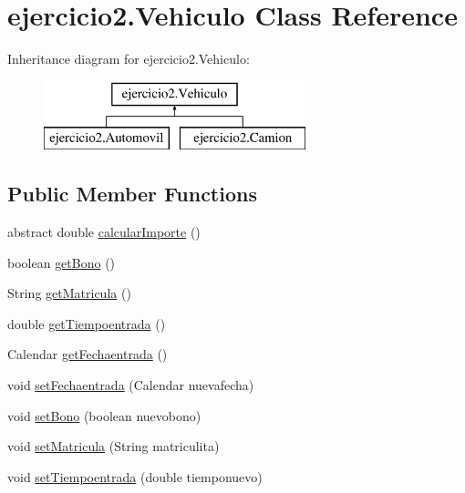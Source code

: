 \hypertarget{classejercicio2_1_1_vehiculo}{}\section{ejercicio2.\+Vehiculo Class Reference}
\label{classejercicio2_1_1_vehiculo}
Inheritance diagram for ejercicio2.\+Vehiculo\+:\begin{figure}[H]
\begin{center}
\leavevmode
\includegraphics[height=2.000000cm]{classejercicio2_1_1_vehiculo}
\end{center}
\end{figure}
\subsection*{Public Member Functions}
\begin{DoxyCompactItemize}
\item 
abstract double \mbox{\hyperlink{classejercicio2_1_1_vehiculo_ab32f1a3fc1893a90bbbaf7889274fff1}{calcular\+Importe}} ()
\item 
boolean \mbox{\hyperlink{classejercicio2_1_1_vehiculo_a2d1656bbaf85a6d0835df1fefc1b7989}{get\+Bono}} ()
\item 
String \mbox{\hyperlink{classejercicio2_1_1_vehiculo_a5dd89b85bb4c8a9da01224fea2b754f0}{get\+Matricula}} ()
\item 
double \mbox{\hyperlink{classejercicio2_1_1_vehiculo_a72ab12e069d44e40cd9a5a56c34932ed}{get\+Tiempoentrada}} ()
\item 
Calendar \mbox{\hyperlink{classejercicio2_1_1_vehiculo_a3ac04e0b44563c07b8aae4126ce07dc4}{get\+Fechaentrada}} ()
\item 
void \mbox{\hyperlink{classejercicio2_1_1_vehiculo_af87ce3fcfad1f20eb2fdbb87caaf6576}{set\+Fechaentrada}} (Calendar nuevafecha)
\item 
void \mbox{\hyperlink{classejercicio2_1_1_vehiculo_a10083fde68a5b3ef8698c76adba64ad7}{set\+Bono}} (boolean nuevobono)
\item 
void \mbox{\hyperlink{classejercicio2_1_1_vehiculo_a839f602fe4695d9cb8d085bab398acd5}{set\+Matricula}} (String matriculita)
\item 
void \mbox{\hyperlink{classejercicio2_1_1_vehiculo_a021e05ca70b02df5ff40d48692beb6ba}{set\+Tiempoentrada}} (double tiemponuevo)
\end{DoxyCompactItemize}
